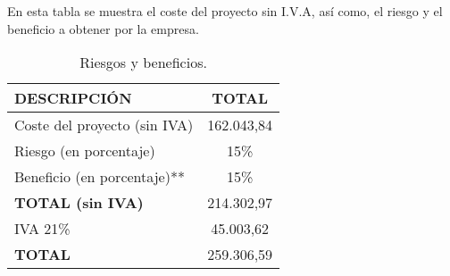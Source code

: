 En esta tabla se muestra el coste del proyecto sin I.V.A, así como, el riesgo y el beneficio a obtener por la empresa.
\begin{table}[H]
\begin{center}
\begin{tabular}{l c}
\textbf{DESCRIPCIÓN} & \textbf{TOTAL}\\ \hline \hline
Coste del proyecto (sin IVA) &  162.043,84\\
Riesgo (en porcentaje) & 15\% \\
Beneficio (en porcentaje)** & 15\% \\ \hline \hline
\textbf{TOTAL (sin IVA)} & 214.302,97\\ \hline \hline
IVA 21\% & 45.003,62 \\\hline \hline
\textbf{TOTAL} & 259.306,59\\ \hline
\end{tabular}
\caption{Riesgos y beneficios.}
\label{tab:total}
\end{center}
\end{table}
